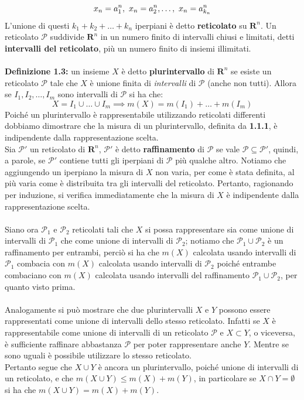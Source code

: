 \documentclass{article}
\begin{document}
\begin{equation}
    x_n = a^n_1, \ x_n = a^n_2, \dots , \ x_n = a^n_{k_n} \notag
\end{equation}
L'unione di questi $k_1 + k_2 + \dots + k_n$ iperpiani è detto \textbf{reticolato} su $\mathbf{R}^n$. Un reticolato $\mathcal{P}$ suddivide $\mathbf{R}^n$ in un numero finito di intervalli chiusi e limitati, detti \textbf{intervalli del reticolato}, più un numero finito di insiemi illimitati. \\ \\
\textbf{Definizione 1.3:} un insieme $X$ è detto \textbf{plurintervallo} di $\mathbf{R}^n$ se esiste un reticolato $\mathcal{P}$ tale che $X$ è unione finita di \textit{intervalli} di $\mathcal{P}$ (anche non tutti). Allora se $I_1, I_2, \dots, I_m$ sono intervalli di $\mathcal{P}$ si ha che:
\begin{equation}
    X = I_1 \cup \dots \cup I_m \implies m(X) = m(I_1) + \dots + m(I_m) \tag{1.1}
\end{equation}
Poiché un plurintervallo è rappresentabile utilizzando reticolati differenti dobbiamo dimostrare che la misura di un plurintervallo, definita da \textbf{1.1.1}, è indipendente dalla rappresentazione scelta. \\
Sia $\mathcal{P}'$ un reticolato di $\mathbf{R}^n$, $\mathcal{P}'$ è detto \textbf{raffinamento} di $\mathcal{P}$ se vale $\mathcal{P} \subseteq \mathcal{P}'$, quindi, a parole, se $\mathcal{P}'$ contiene tutti gli iperpiani di $\mathcal{P}$ più qualche altro. Notiamo che aggiungendo un iperpiano la misura di $X$ non varia, per come è stata definita, al più varia come è distribuita tra gli intervalli del reticolato. Pertanto, ragionando per induzione, si verifica immediatamente che la misura di $X$ è indipendente dalla rappresentazione scelta. \\ \\
Siano ora $\mathcal{P}_1$ e $\mathcal{P}_2$ reticolati tali che $X$ si possa rappresentare sia come unione di intervalli di $\mathcal{P}_1$ che come unione di intervalli di $\mathcal{P}_2$; notiamo che $\mathcal{P}_1 \cup \mathcal{P}_2$ è un raffinamento per entrambi, perciò si ha che $m(X)$ calcolata usando intervalli di $\mathcal{P}_1$ combacia con $m(X)$ calcolata usando intervalli di $\mathcal{P}_2$ poiché entrambe combaciano con $m(X)$ calcolata usando intervalli del raffinamento $\mathcal{P}_1 \cup \mathcal{P}_2$, per quanto visto prima. \\ \\
Analogamente si può mostrare che due plurintervalli $X$ e $Y$ possono essere rappresentati come unione di intervalli dello stesso reticolato. Infatti se $X$ è rappresentabile come unione di intervalli di un reticolato $\mathcal{P}$ e $X \subset Y$, o viceversa, è sufficiente raffinare abbastanza $\mathcal{P}$ per poter rappresentare anche $Y$. Mentre se sono uguali è possibile utilizzare lo stesso reticolato. \\
Pertanto segue che $X \cup Y$ è ancora un plurintervallo, poiché unione di intervalli di un reticolato, e che $m(X \cup Y) \leq m(X) + m(Y)$, in particolare se $X \cap Y = \emptyset$ si ha che $m(X \cup Y) = m(X) + m(Y)$.
\end{document}
